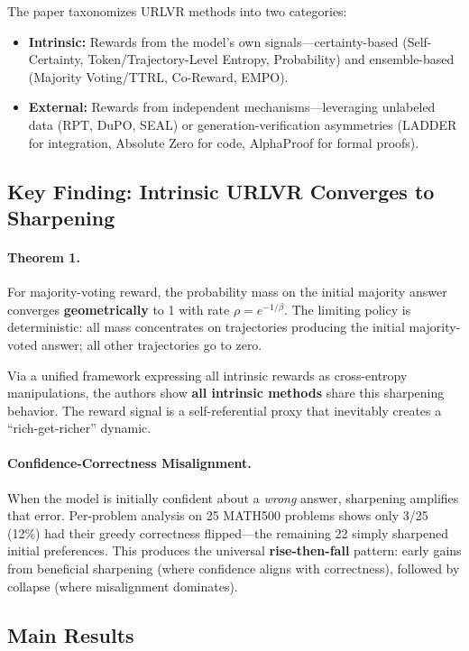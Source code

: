 \documentclass[11pt]{article}
\begin{document}
The paper taxonomizes URLVR methods into two categories:
\begin{itemize}
    \item \textbf{Intrinsic:} Rewards from the model's own signals---certainty-based (Self-Certainty, Token/Trajectory-Level Entropy, Probability) and ensemble-based (Majority Voting/TTRL, Co-Reward, EMPO).
    \item \textbf{External:} Rewards from independent mechanisms---leveraging unlabeled data (RPT, DuPO, SEAL) or generation-verification asymmetries (LADDER for integration, Absolute Zero for code, AlphaProof for formal proofs).
\end{itemize}

\subsection{Key Finding: Intrinsic URLVR Converges to Sharpening}

\paragraph{Theorem 1.} For majority-voting reward, the probability mass on the initial majority answer converges \textbf{geometrically} to 1 with rate $\rho = e^{-1/\beta}$. The limiting policy is deterministic: all mass concentrates on trajectories producing the initial majority-voted answer; all other trajectories go to zero.

Via a unified framework expressing all intrinsic rewards as cross-entropy manipulations, the authors show \textbf{all intrinsic methods} share this sharpening behavior. The reward signal is a self-referential proxy that inevitably creates a ``rich-get-richer'' dynamic.

\paragraph{Confidence-Correctness Misalignment.} When the model is initially confident about a \emph{wrong} answer, sharpening amplifies that error. Per-problem analysis on 25 MATH500 problems shows only 3/25 (12\%) had their greedy correctness flipped---the remaining 22 simply sharpened initial preferences. This produces the universal \textbf{rise-then-fall} pattern: early gains from beneficial sharpening (where confidence aligns with correctness), followed by collapse (where misalignment dominates).

\subsection{Main Results}
\end{document}
